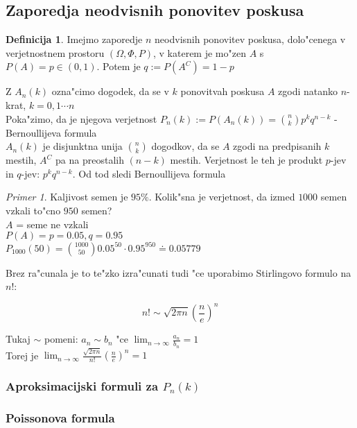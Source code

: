 \documentclass[a4paper,12pt]{article}
\theoremstyle{definition}
\newtheorem{defn}[counter]{Definicija}
\theoremstyle{remark}
\newtheorem*{ex}{Primer}
\begin{document}
\subsection{Zaporedja neodvisnih ponovitev poskusa}

\begin{defn}
    Imejmo zaporedje $n$ neodvisnih ponovitev poskusa, dolo"cenega v verjetnostnem prostoru $(\Omega, \Phi, P)$,
    v katerem je mo"zen $A$ s $P(A) = p \in (0,1)$. Potem je $q := P(A^C) = 1 - p$
\end{defn}

Z $A_n(k)$ ozna"cimo dogodek, da se v $k$ ponovitvah poskusa $A$ zgodi natanko $n$-krat, $k = 0, 1 \cdots n$ \\
Poka"zimo, da je njegova verjetnost $P_n(k) := P(A_n(k)) = \binom{n}{k} p^k q^{n-k}$ - Bernoullijeva formula \\
$A_n(k)$ je disjunktna unija $\binom{n}{k}$ dogodkov, da se $A$ zgodi na predpisanih $k$ mestih, $A^C$ pa na
preostalih $(n-k)$ mestih. Verjetnost le teh je produkt $p$-jev in $q$-jev: $p^k q^{n-k}$. Od tod sledi
Bernoullijeva formula

\begin{ex}
    Kaljivost semen je $95\%$. Kolik"sna je verjetnost, da izmed $1000$ semen vzkali to"cno $950$ semen? \\
    $A$ = seme ne vzkali \\
    $P(A) = p = 0.05, q = 0.95$ \\
    $P_{1000}(50) = \binom{1000}{50} 0.05^{50} \cdot 0.95^{950} \doteq 0.05779$
\end{ex}

Brez ra"cunala je to te"zko izra"cunati tudi "ce uporabimo Stirlingovo formulo na $n!$:

\begin{equation*}
    n! \sim \sqrt{2\pi n} (\frac{n}{e})^n
\end{equation*}

Tukaj $\sim$ pomeni: $a_n \sim b_n$ "ce $\lim_{n \to \infty} \frac{a_n}{b_n} = 1$ \\
Torej je $\lim_{n \to \infty} \frac{\sqrt{2\pi n}}{n!} (\frac{n}{e})^n = 1$

\subsubsection{Aproksimacijski formuli za $P_n(k)$}

\subsubsection{Poissonova formula}
\end{document}
